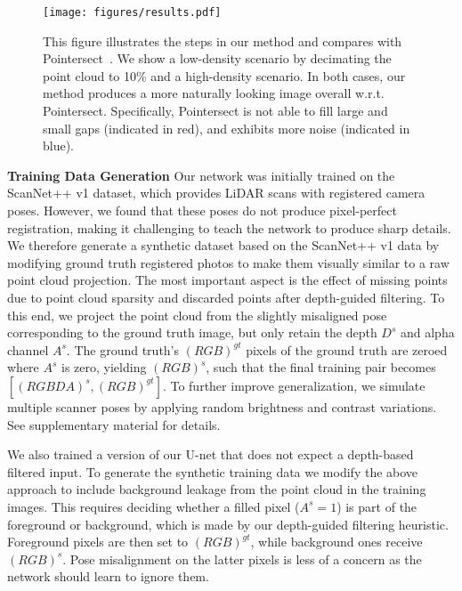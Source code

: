 \documentclass[twocolumn]{article}
\begin{document}
\begin{figure*}
    \centering
    \texttt{[image: figures/results.pdf]}
    \caption{This figure illustrates the steps in our method and compares with Pointersect~\cite{pointersect}. We show a low-density scenario by decimating the point cloud to 10\% and a high-density scenario. In both cases, our method produces a more naturally looking image overall w.r.t. Pointersect. Specifically, Pointersect is not able to fill large and small gaps (indicated in red), and exhibits more noise (indicated in blue).}
    \label{fig:results}
\end{figure*}

\textbf{Training Data Generation}
Our network was initially trained on the ScanNet++ v1 dataset, which provides LiDAR scans with registered camera poses. However, we found that these poses do not produce pixel-perfect registration, making it challenging to teach the network to produce sharp details. We therefore generate a synthetic dataset based on the ScanNet++ v1 data by modifying ground truth registered photos to make them visually similar to a raw point cloud projection. The most important aspect is the effect of missing points due to point cloud sparsity and discarded points after depth-guided filtering. To this end, we project the point cloud from the slightly misaligned pose corresponding to the ground truth image, but only retain the depth $D^s$ and alpha channel $A^s$. The ground truth's $(RGB)^{gt}$ pixels of the ground truth are zeroed where $A^s$ is zero, yielding $(RGB)^s$, such that the final training pair becomes $[(RGBDA)^s, (RGB)^{gt}]$. To further improve generalization, we simulate multiple scanner poses by applying random brightness and contrast variations. See supplementary material for details. 


We also trained a version of our U-net that does not expect a depth-based filtered input. To generate the synthetic training data we modify the above approach to include background leakage from the point cloud in the training images. This requires deciding whether a filled pixel ($A^s=1$) is part of the foreground or background, which is made by our depth-guided filtering heuristic. Foreground pixels are then set to $(RGB)^{gt}$, while background ones receive $(RGB)^{s}$. Pose misalignment on the latter pixels is less of a concern as the network should learn to ignore them.
\end{document}

